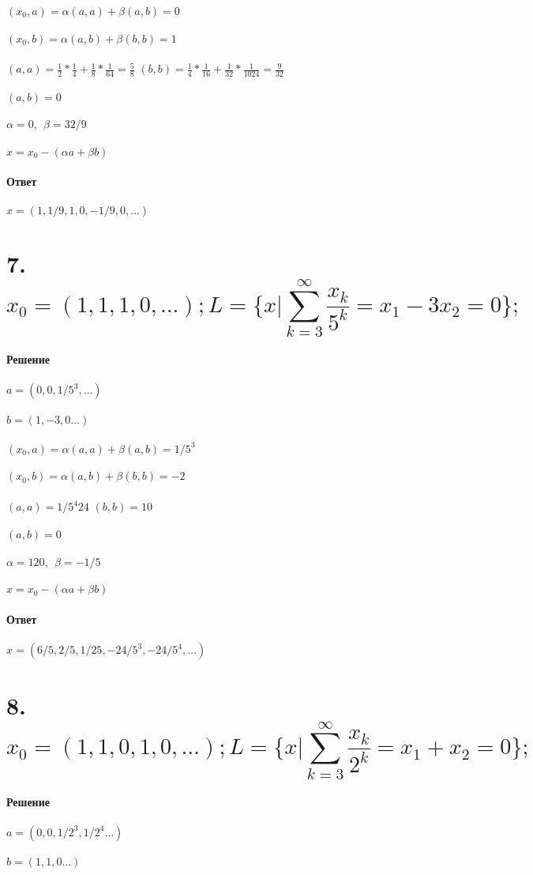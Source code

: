 \documentclass{article}
\begin{document}
	$(x_0, a)=\alpha(a,a)+\beta(a,b)=0$\\ \\
	$(x_0, b)=\alpha(a,b)+\beta(b,b)=1$\\ \\
	$(a,a)=\frac{1}{2}*\frac{1}{4}+\frac{1}{8}*\frac{1}{64}=\frac{5}{8} $
	$(b,b)=\frac{1}{4}*\frac{1}{16}+\frac{1}{32}*\frac{1}{1024}=\frac{9}{32}$\\ \\
	$(a,b)=0$\\ \\
	$\alpha=0,\ \ \beta=32/9$\\ \\
	$x = x_0 - (\alpha a+\beta b)$\\ \\
	\textbf{Ответ}\\ \\
	$x=(1,1/9,1,0,-1/9,0,\dots)$	
		
	
	\section*{7.
	$$x_0=(1,1,1,0,\dots); L=\{x|\sum_{k=3}^{\infty}\frac{x_k}{5^k}=x_1-3x_2=0 \};$$}
	\textbf{Решение}\\ \\
	$a=(0,0,1/5^3,\dots)$\\ \\
	$b=(1,-3,0\dots)$\\ \\
	
	$(x_0, a)=\alpha(a,a)+\beta(a,b)=1/5^3$\\ \\
	$(x_0, b)=\alpha(a,b)+\beta(b,b)=-2$\\ \\
	$(a,a)=1/5^4 24 $
	$(b,b)=10$\\ \\
	$(a,b)=0$\\ \\
	$\alpha=120,\ \ \beta=-1/5$\\ \\
	$x = x_0 - (\alpha a+\beta b)$\\ \\
	\textbf{Ответ}\\ \\
	$x=(6/5,2/5,1/25,-24/5^3,-24/5^4,\dots)$
	
	
	\section*{8.
	$$x_0=(1,1,0,1,0,\dots); L=\{x|\sum_{k=3}^{\infty}\frac{x_k}{2^k}=x_1+x_2=0 \};$$}
	\textbf{Решение}\\ \\
	$a=(0,0,1/2^3,1/2^4\dots)$\\ \\
	$b=(1,1,0\dots)$\\ \\
	
\end{document}
